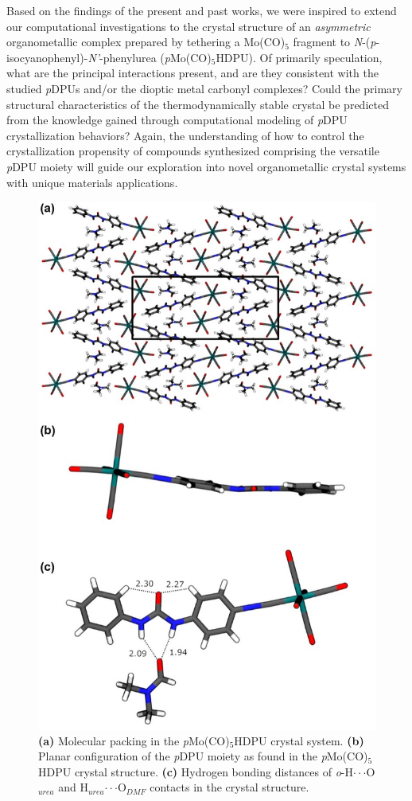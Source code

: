 Based on the findings of the present and past works, we were inspired to extend our computational investigations to the crystal structure of an \textit{asymmetric} organometallic complex prepared by tethering a Mo(CO)$_{5}$ fragment to \textit{N}-(\textit{p}-isocyanophenyl)-\textit{N'}-phenylurea (\textit{p}Mo(CO)$_{5}$HDPU). Of primarily speculation, what are the principal interactions present, and are they consistent with the studied \textit{p}DPUs and/or the dioptic metal carbonyl complexes? Could the primary structural characteristics of the thermodynamically stable crystal be predicted from the knowledge gained through computational modeling of \textit{p}DPU crystallization behaviors? Again, the understanding of how to control the crystallization propensity of compounds synthesized comprising the versatile \textit{p}DPU moiety will guide our exploration into novel organometallic crystal systems with unique materials applications.


\begin{figure}[h!]
    \centering
    \includegraphics[width=0.8\linewidth]{figures/pub3/Picture8.jpg}
    \caption{\textbf{(a)} Molecular packing in the \textit{p}Mo(CO)$_{5}$HDPU crystal system. \textbf{(b)} Planar configuration of the \textit{p}DPU moiety as found in the \textit{p}Mo(CO)$_{5}$HDPU crystal structure. \textbf{(c)} Hydrogen bonding distances of \textit{o}-H$\cdot \cdot \cdot$O$_{urea}$ and H$_{urea}$$\cdot \cdot \cdot$O$_{DMF}$ contacts in the crystal structure.}\label{fig:mol-pack-MoCO5HDPU}
\end{figure}



